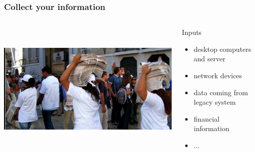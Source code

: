 \documentclass{beamer}
\begin{document}
\begin{frame}

    \frametitle{Collect your information}

 \begin{columns}
 \begin{column}{0.34\textwidth}
    \includegraphics[height=6.5cm]{pics/information.jpg}
 \end{column}
 \begin{column}{0.90\textwidth}
    \begin{block}{Inputs}
        \begin{itemize}
            \item desktop computers and server
            \item network devices
            \item data coming from legacy system
            \item financial information
            \item ...
        \end{itemize}
    \end{block}

 \end{column}
\end{columns}


\end{frame}
\end{document}
